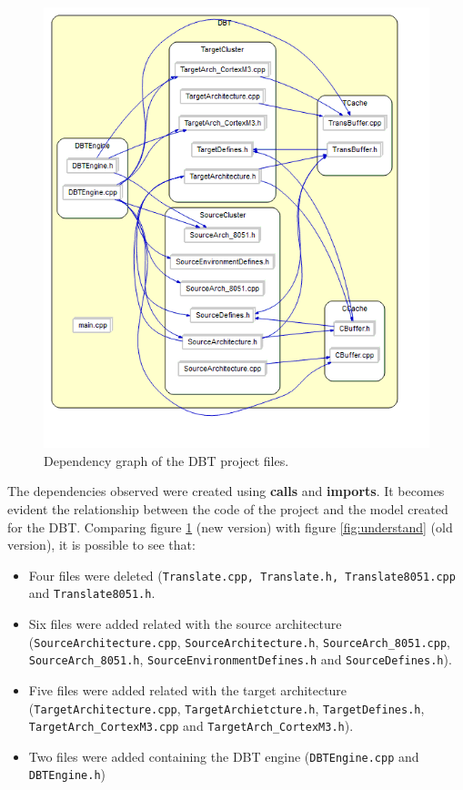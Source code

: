 \begin{figure}[!htb]
\centerline{
\includegraphics[scale=0.7]{images/DBT_understand}
}
\caption{Dependency graph of the DBT project files.}
\label{fig:refactorunderstand} 
\end{figure}

The dependencies observed were created using \textbf{calls} and \textbf{imports}. It becomes evident the relationship between the code of the project and the model created for the DBT. Comparing figure \ref{fig:refactorunderstand} (new version) with figure \ref{fig:understand} (old version), it is possible to see that:
\begin{itemize}
\item Four files were deleted (\texttt{Translate.cpp, Translate.h, Translate8051.cpp} and \texttt{Translate8051.h}.
\item Six files were added related with the source architecture (\texttt{SourceArchitecture.cpp}, \texttt{SourceArchitecture.h}, \texttt{SourceArch\_8051.cpp}, \texttt{SourceArch\_8051.h}, \texttt{SourceEnvironmentDefines.h} and \texttt{SourceDefines.h}).
\item Five files were added related with the target architecture (\texttt{TargetArchitecture.cpp}, \texttt{TargetArchietcture.h}, \texttt{TargetDefines.h}, \texttt{TargetArch\_CortexM3.cpp} and \texttt{TargetArch\_CortexM3.h}).
\item Two files were added containing the DBT engine (\texttt{DBTEngine.cpp} and \texttt{DBTEngine.h})
\end{itemize}

